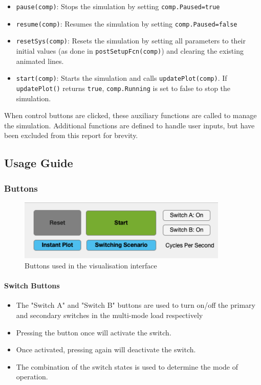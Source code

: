 \begin{itemize}
    \item \texttt{pause(comp)}: Stops the simulation by setting \texttt{comp.Paused=true}
    \item \texttt{resume(comp)}: Resumes the simulation by setting \texttt{comp.Paused=false}
    \item \texttt{resetSys(comp)}: Resets the simulation by setting all parameters to their initial values (as done in \texttt{postSetupFcn(comp)}) and clearing the existing animated lines.
    \item \texttt{start(comp)}: Starts the simulation and calls \texttt{updatePlot(comp)}. If \texttt{updatePlot()} returns \texttt{true}, \texttt{comp.Running} is set to false to stop the simulation.
\end{itemize}

When control buttons are clicked, these auxiliary functions are called to manage the simulation. Additional functions are defined to handle user inputs, but have been excluded from this report for brevity. 


\pagebreak
\subsection{Usage Guide}
\subsubsection{Buttons}
\begin{figure}[H]
     \centering
     \includegraphics[width=10cm]{graphics/visualisation/ui_buttons}
     \caption{Buttons used in the visualisation interface}
\end{figure}

\paragraph{Switch Buttons}
\begin{itemize}
	\item The "Switch A" and "Switch B" buttons are used to turn on/off the primary and secondary switches in the multi-mode load respectively
	\item Pressing the button once will activate the switch.
	\item Once activated, pressing again will deactivate the switch.
	\item The combination of the switch states is used to determine the mode of operation.
\end{itemize}

